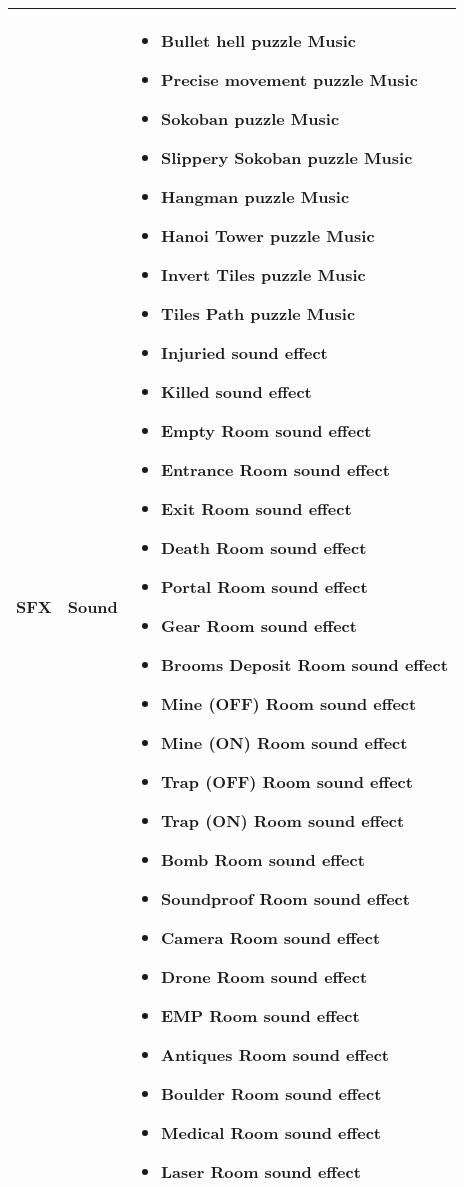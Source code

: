 \begin{tabular}{|m{3cm}|m{3cm}|m{7cm}|}
	\hline
	\textbf{SFX}& Sound & 
	\begin{itemize}
		\item Bullet hell puzzle Music
		\item Precise movement puzzle Music
		\item Sokoban puzzle Music
		\item Slippery Sokoban puzzle Music
		\item Hangman puzzle Music
		\item Hanoi Tower puzzle Music
		\item Invert Tiles puzzle Music
		\item Tiles Path puzzle Music
     	\item Injuried sound effect
     	\item Killed sound effect
		\item Empty Room sound effect
		\item Entrance Room sound effect
		\item Exit Room sound effect
		\item Death Room sound effect
		\item Portal Room sound effect
		\item Gear Room sound effect
		\item Brooms Deposit Room sound effect
		\item Mine (OFF) Room sound effect
		\item Mine (ON) Room sound effect
		\item Trap (OFF) Room sound effect
		\item Trap (ON) Room sound effect
		\item Bomb Room sound effect
		\item Soundproof Room sound effect
		\item Camera Room sound effect
		\item Drone Room sound effect
		\item EMP Room sound effect
		\item Antiques Room sound effect
		\item Boulder Room sound effect
		\item Medical Room sound effect	
		\item Laser Room sound effect
	\end{itemize}
	\\
	\hline
\end{tabular}
\pagebreak

